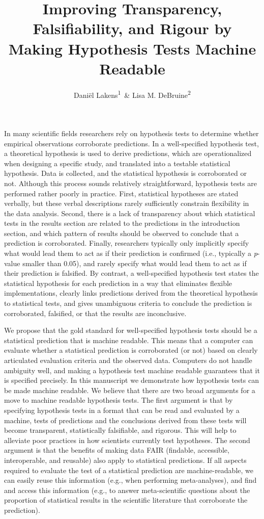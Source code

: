 \documentclass[english,doc,floatsintext]{apa6}
\author{Daniël Lakens\textsuperscript{1}\ \& Lisa M. DeBruine\textsuperscript{2}}
\affiliation{
\vspace{0.5cm}
\textsuperscript{1} School of Innovation Sciences, Eindhoven University of Technology\\\textsuperscript{2} Institute of Neuroscience and Psychology, University of Glasgow}
\title{Improving Transparency, Falsifiability, and Rigour by Making Hypothesis Tests Machine Readable}
\date{}
\begin{document}
\maketitle

In many scientific fields researchers rely on hypothesis tests to determine whether empirical observations corroborate predictions. In a well-specified hypothesis test, a theoretical hypothesis is used to derive predictions, which are operationalized when designing a specific study, and translated into a testable statistical hypothesis. Data is collected, and the statistical hypothesis is corroborated or not. Although this process sounds relatively straightforward, hypothesis tests are performed rather poorly in practice. First, statistical hypotheses are stated verbally, but these verbal descriptions rarely sufficiently constrain flexibility in the data analysis. Second, there is a lack of transparency about which statistical tests in the results section are related to the predictions in the introduction section, and which pattern of results should be observed to conclude that a prediction is corroborated. Finally, researchers typically only implicitly specify what would lead them to act as if their prediction is confirmed (i.e., typically a \emph{p}-value smaller than 0.05), and rarely specify what would lead them to act as if their prediction is falsified. By contrast, a well-specified hypothesis test states the statistical hypothesis for each prediction in a way that eliminates flexible implementations, clearly links predictions derived from the theoretical hypothesis to statistical tests, and gives unambiguous criteria to conclude the prediction is corroborated, falsified, or that the results are inconclusive.

We propose that the gold standard for well-specified hypothesis tests should be a statistical prediction that is machine readable. This means that a computer can evaluate whether a statistical prediction is corroborated (or not) based on clearly articulated evaluation criteria and the observed data. Computers do not handle ambiguity well, and making a hypothesis test machine readable guarantees that it is specified precisely. In this manuscript we demonstrate how hypothesis tests can be made machine readable. We believe that there are two broad arguments for a move to machine readable hypothesis tests. The first argument is that by specifying hypothesis tests in a format that can be read and evaluated by a machine, tests of predictions and the conclusions derived from these tests will become transparent, statistically falsifiable, and rigorous. This will help to alleviate poor practices in how scientists currently test hypotheses. The second argument is that the benefits of making data FAIR (findable, accessible, interoperable, and reusable) also apply to statistical predictions. If all aspects required to evaluate the test of a statistical prediction are machine-readable, we can easily reuse this information (e.g., when performing meta-analyses), and find and access this information (e.g., to answer meta-scientific questions about the proportion of statistical results in the scientific literature that corroborate the prediction).
\end{document}
